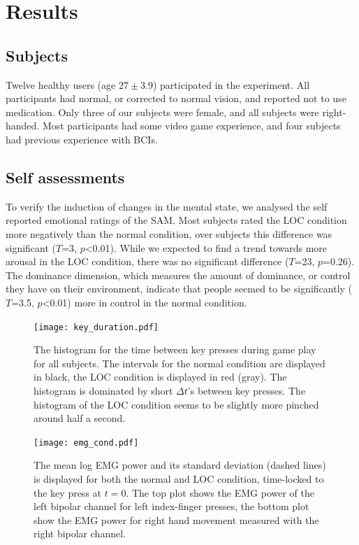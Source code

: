 \section{Results}
\subsection{Subjects}
Twelve healthy users (age $27 \pm 3.9$) participated in the experiment.  All
participants had normal, or corrected to normal vision, and reported not to use
medication. Only three of our subjects were female, and all subjects were
right-handed. Most participants had some video game experience, and four
subjects had previous experience with \acp{BCI}.

\subsection{Self assessments}
To verify the induction of changes in the mental state, we analysed the self
reported emotional ratings of the \ac{SAM}. Most subjects rated the \ac{LOC}
condition more negatively than the normal condition, over subjects this
difference was significant ($T$=3, $p$\textless 0.01). While we expected to
find a trend towards more arousal in the \ac{LOC} condition, there was no
significant difference ($T$=23, $p$=0.26). The dominance dimension, which
measures the amount of dominance, or control they have on their environment,
indicate that people seemed to be significantly ($T$=3.5, $p$\textless 0.01)
more in control in the normal condition.


\begin{figure}
  \center
  \texttt{[image: key\_duration.pdf]}
  \caption{The histogram for the time between key presses during game play for
  all subjects. The intervals for the normal condition are displayed in black,
  the \protect\ac{LOC} condition is displayed in red (gray). The histogram is
  dominated by short $\Delta t$'s between key presses. The histogram of the
  \protect\ac{LOC} condition seems to be slightly more pinched around half a
  second.}
  \label{fig:key_duration}
\end{figure}

\begin{figure}
  \center
  \texttt{[image: emg\_cond.pdf]}
  \caption{The mean log \protect\ac{EMG} power and its standard deviation
  (dashed lines) is displayed for both the normal and \protect\ac{LOC}
  condition, time-locked to the key press at $t=0$. The top plot shows the EMG
  power of the left bipolar channel for left index-finger presses, the bottom
  plot show the EMG power for right hand movement measured with the right
  bipolar channel.}
  \label{fig:emg_cond}
\end{figure}

